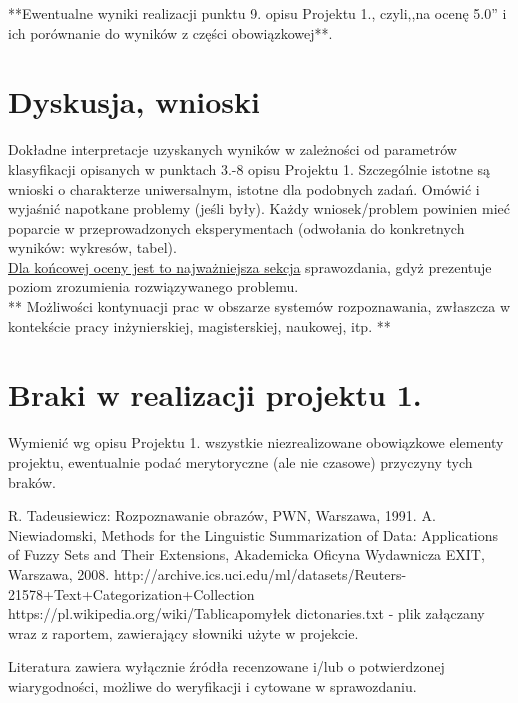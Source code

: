 \documentclass{classrep}
\begin{document}
{**Ewentualne wyniki realizacji punktu 9. opisu Projektu 1., czyli,,na ocenę 5.0'' i ich porównanie do wyników z
części obowiązkowej**.}\\



\section{Dyskusja, wnioski}
Dokładne interpretacje uzyskanych wyników w zależności od parametrów klasyfikacji
opisanych w punktach 3.-8 opisu Projektu 1. 
Szczególnie istotne są wnioski o charakterze uniwersalnym, istotne dla podobnych zadań. 
Omówić i wyjaśnić napotkane problemy (jeśli były). Każdy wniosek/problem powinien mieć poparcie
w przeprowadzonych eksperymentach (odwołania do konkretnych wyników: wykresów,
tabel). \\
\underline{Dla końcowej oceny jest to najważniejsza sekcja} sprawozdania, gdyż prezentuje poziom
zrozumienia rozwiązywanego problemu.\\

** Możliwości kontynuacji prac w obszarze systemów rozpoznawania, zwłaszcza w kontekście pracy inżynierskiej,
magisterskiej, naukowej, itp. **\\



\section{Braki w realizacji projektu 1.}
Wymienić wg opisu Projektu 1. wszystkie niezrealizowane obowiązkowe elementy projektu, ewentualnie
podać merytoryczne (ale nie czasowe) przyczyny tych braków. 


\begin{thebibliography}{0}
 R. Tadeusiewicz: Rozpoznawanie obrazów, PWN, Warszawa, 1991.  
 A. Niewiadomski, Methods for the Linguistic Summarization of Data: Applications of Fuzzy Sets and Their Extensions, Akademicka Oficyna Wydawnicza EXIT, Warszawa, 2008.
 http://archive.ics.uci.edu/ml/datasets/Reuters-21578+Text+Categorization+Collection
 https://pl.wikipedia.org/wiki/Tablica\textunderscore pomyłek
 dictonaries.txt - plik załączany wraz z raportem, zawierający słowniki użyte w projekcie.
\end{thebibliography}

Literatura zawiera wyłącznie źródła recenzowane i/lub o potwierdzonej wiarygodności,
możliwe do weryfikacji i cytowane w sprawozdaniu. 
\end{document}
